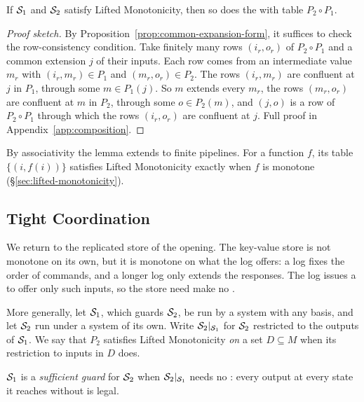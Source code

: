 \begin{lemma}[Composition]
\label{lem:composition}
If $\mathcal{S}_1$ and $\mathcal{S}_2$ satisfy Lifted Monotonicity, then so does the \spectype with table $P_2\circ P_1$.
\end{lemma}

\begin{proof}[Proof sketch]
By Proposition~\ref{prop:common-expansion-form}, it suffices to check the
row-consistency condition.  Take finitely many rows $(i_r,o_r)$ of $P_2\circ P_1$ and a common extension $j$ of their inputs.  Each row comes from an intermediate value $m_r$ with $(i_r,m_r)\in P_1$ and $(m_r,o_r)\in P_2$.  The rows $(i_r,m_r)$ are confluent at $j$ in $P_1$, through some $m\in P_1(j)$.  So $m$ extends every $m_r$, the rows $(m_r,o_r)$ are confluent at $m$ in $P_2$, through some $o\in P_2(m)$, and $(j,o)$ is a row of $P_2\circ P_1$ through which the rows $(i_r,o_r)$ are confluent at $j$.  Full proof
in Appendix~\ref{app:composition}.
\end{proof}

By associativity the lemma extends to finite pipelines.  For a function $f$,
its table $\{(i,f(i))\}$ satisfies Lifted Monotonicity exactly when $f$ is
monotone (\S\ref{sec:lifted-monotonicity}).

\subsection{Tight Coordination}
\label{sec:tight-coordination}

We return to the replicated store of the opening.  The key-value store is not
monotone on its own, but it is monotone on what the log offers: a log fixes
the order of commands, and a longer log only extends the responses.  The log
issues a \commitment to offer only such inputs, so the store need make no
\commitments.

More generally, let $\mathcal{S}_1$, which guards $\mathcal{S}_2$, be run by a system with any basis, and
let $\mathcal{S}_2$ run under a system of its own.  Write $\mathcal{S}_2|_{\mathcal{S}_1}$ for $\mathcal{S}_2$ restricted to the outputs of
$\mathcal{S}_1$.  We say that $P_2$ satisfies Lifted Monotonicity \emph{on} a set
$D\subseteq M$ when its restriction to inputs in $D$ does.

\begin{definition}
\label{def:sufficient-guard}
$\mathcal{S}_1$ is a \emph{sufficient guard} for $\mathcal{S}_2$ when
$\mathcal{S}_2|_{\mathcal{S}_1}$ needs no \commitment: every output at every state it
reaches without \commitment is legal.
\end{definition}

